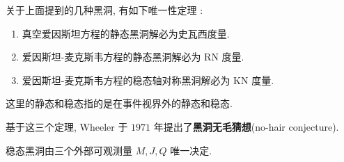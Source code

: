关于上面提到的几种黑洞, 有如下唯一性定理 \cite[\S\,13.6]{梁灿彬2000微分几何入门与广义相对论}:
\begin{enumerate}
	\item 真空爱因斯坦方程的静态黑洞解必为史瓦西度量.
	\item 爱因斯坦-麦克斯韦方程的静态黑洞解必为 RN 度量.
	\item 爱因斯坦-麦克斯韦方程的稳态轴对称黑洞解必为 KN 度量.
\end{enumerate}
\begin{remark}
	这里的静态和稳态指的是在事件视界外的静态和稳态.
\end{remark}
基于这三个定理, Wheeler 于 $1971$ 年提出了{\bf 黑洞无毛猜想}(no-hair conjecture).
\begin{definition}[黑洞无毛猜想]
	稳态黑洞由三个外部可观测量 $M,J,Q$ 唯一决定.
\end{definition}